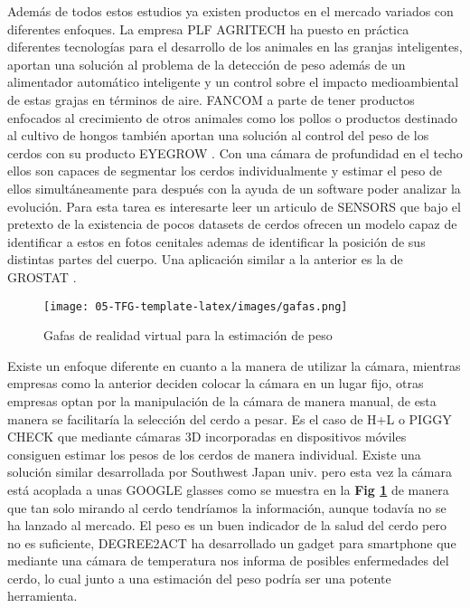 \documentclass[12pt,a4paper]{article}
\begin{document}
Además de todos estos estudios ya existen productos en el mercado variados con diferentes enfoques.
La empresa PLF AGRITECH \cite{PLF} ha puesto en práctica diferentes tecnologías para el desarrollo de los animales en las granjas inteligentes, aportan una solución al problema de la detección de peso además de un alimentador automático inteligente y un control sobre el impacto medioambiental de estas grajas en términos de aire.
FANCOM \cite{fancom} a parte de tener productos enfocados al crecimiento de otros animales como los pollos o productos destinado al cultivo de hongos también aportan una solución al control del peso de los cerdos con su producto EYEGROW \cite{fancomvideo}. Con una cámara de profundidad en el techo ellos son capaces de segmentar los cerdos individualmente y estimar el peso de ellos simultáneamente para después con la ayuda de un software poder analizar la evolución. Para esta tarea es interesarte leer un articulo de SENSORS \cite{deteccion} que bajo el pretexto de la existencia de pocos datasets de cerdos ofrecen un modelo capaz de identificar a estos en fotos cenitales ademas de identificar la posición de sus distintas partes del cuerpo. Una aplicación similar a la anterior es la de GROSTAT \cite{GroStat}.
\begin{figure}[b]
\caption{Gafas de realidad virtual para la estimación de peso}
\centering
\texttt{[image: 05-TFG-template-latex/images/gafas.png]}
\label{gafas}
\end{figure}
Existe un enfoque diferente en cuanto a la manera de utilizar la cámara, mientras empresas como la anterior deciden colocar la cámara en un lugar fijo, otras empresas optan por la manipulación de la cámara de manera manual, de esta manera se facilitaría la selección del cerdo a pesar. Es el caso de H+L \cite{H+L} o PIGGY CHECK \cite{piggycheck} que mediante cámaras 3D incorporadas en dispositivos móviles consiguen estimar los pesos de los cerdos de manera individual. Existe una solución similar desarrollada por Southwest Japan univ. \cite{japon} pero esta vez la cámara está acoplada a unas GOOGLE glasses \cite{google} como se muestra en la \textbf{Fig \ref{gafas}} de manera que tan solo mirando al cerdo tendríamos la información, aunque todavía no se ha lanzado al mercado.
El peso es un buen indicador de la salud del cerdo pero no es suficiente, DEGREE2ACT \cite{degree} ha desarrollado un gadget para smartphone que mediante una cámara de temperatura nos informa de posibles enfermedades del cerdo, lo cual junto a una estimación del peso podría ser una potente herramienta.
\end{document}
